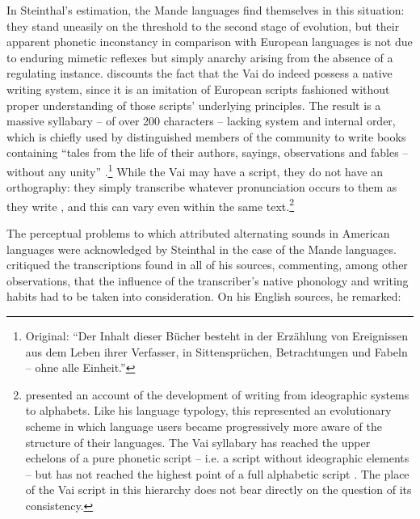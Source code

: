 \documentclass[output=paper]{langscibook}
\begin{document}
In Steinthal's estimation, the Mande languages find themselves in this situation: they stand uneasily on the threshold to the second stage of evolution, but their apparent phonetic inconstancy in comparison with European languages is not due to enduring mimetic reflexes but simply anarchy arising from the absence of a regulating instance. \citet[257--266]{Steinthal1867} discounts the fact that the Vai do indeed possess a native writing system, since it is an imitation of European scripts fashioned without proper understanding of those scripts' underlying principles. The result is a massive syllabary -- of over 200 characters -- lacking system and internal order, which is chiefly used by distinguished members of the community to write books containing ``tales from the life of their authors, sayings, observations and fables -- without any unity'' \citep[260]{Steinthal1867}.\footnote{Original: ``Der Inhalt dieser Bücher besteht in der Erzählung von Ereignissen aus dem Leben ihrer Verfasser, in Sittensprüchen, Betrachtungen und Fabeln -- ohne alle Einheit.''} While the Vai may have a script, they do not have an orthography: they simply transcribe whatever pronunciation occurs to them as they write \citep[264--266]{Steinthal1867}, and this can vary even within the same text.\footnote{\citet{Steinthal1852} presented an account of the development of writing from ideographic systems to alphabets. Like his language typology, this represented an evolutionary scheme in which language users became progressively more aware of the structure of their languages. The Vai syllabary has reached the upper echelons of a pure phonetic script -- i.e. a script without ideographic elements -- but has not reached the highest point of a full alphabetic script \citep[262--264]{Steinthal1867}. The place of the Vai script in this hierarchy does not bear directly on the question of its consistency.}

The perceptual problems to which \citet{Boas1889} attributed alternating sounds in American languages were acknowledged by Steinthal in the case of the Mande languages. \citet{Steinthal1867} critiqued the transcriptions found in all of his sources, commenting, among other observations, that the influence of the transcriber's native phonology and writing habits had to be taken into consideration. On his English sources, he remarked:
\end{document}
